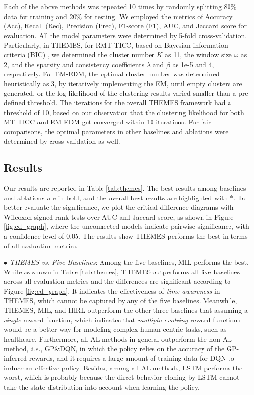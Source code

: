 \documentclass{article}
\begin{document}
Each of the above methods was repeated 10 times by randomly splitting 80\% data for training and 20\% for testing. We employed the metrics of Accuracy (Acc), Recall (Rec), Precision (Prec), F1-score (F1), AUC, and Jaccard score for evaluation. All the model parameters were determined by 5-fold cross-validation. Particularly, in THEMES, for RMT-TICC, based on Bayesian information criteria (BIC) \cite{watanabe2013widely}, we determined the cluster number $K$ as 11, the window size $\omega$ as 2, and the sparsity and consistency coefficients $\lambda$ and $\beta$ as 1e-5 and 4, respectively. For EM-EDM, the optimal cluster number was determined heuristically as 3, by iteratively implementing the EM, until empty clusters are generated, or the log-likelihood of the clustering results varied smaller than a pre-defined threshold. The iterations for the overall THEMES framework had a threshold of 10, based on our observation that the clustering likelihood for both MT-TICC and EM-EDM get converged within 10 iterations. For fair comparisons, the optimal parameters in other baselines and ablations were determined by cross-validation as well.


\subsection{Results} 


Our results are reported in Table \ref{tab:themes}. The best results among baselines and ablations are in bold, and the overall best results are highlighted with *. To better evaluate the significance, we plot the critical difference diagrams with Wilcoxon signed-rank tests over AUC and Jaccard score, as shown in Figure \ref{fig:cd_graph}, where the unconnected models indicate pairwise significance, with a confidence level of 0.05. The results show THEMES performs the best in terms of all evaluation metrics.


\noindent $\bullet$ \textit{THEMES vs. Five Baselines}: Among the five baselines, MIL performs the best. While as shown in Table \ref{tab:themes}, THEMES outperforms all five baselines across all evaluation metrics and the differences are significant according to  Figure \ref{fig:cd_graph}. It indicates the effectiveness of \emph{time-awareness} in THEMES, which cannot be captured by any of the five baselines. 
Meanwhile, THEMES, MIL, and HIRL outperform the other three baselines that assuming a \emph{single} reward function, which indicates that \emph{multiple evolving} reward functions would be a better way for modeling complex human-centric tasks, such as healthcare. Furthermore, all AL methods in general outperform the non-AL method, \textit{i.e.}, GP\&DQN, in which the policy relies on the accuracy of the GP-inferred rewards, and it requires a large amount of training data for DQN to induce an effective policy. Besides, among all AL methods, LSTM performs the worst, which is probably because the direct behavior cloning by LSTM cannot take the state distribution into account when learning the policy. 
\end{document}
